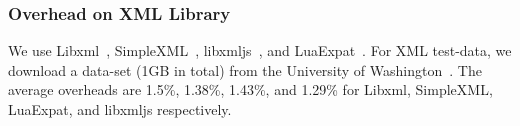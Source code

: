 %


\subsubsection{Overhead on XML Library}
\label{appendix:microbenchmarks_xml}
We use Libxml~\cite{libxml}, SimpleXML~\cite{simplexml}, libxmljs~\cite{libxmljs}, and LuaExpat~\cite{luaexpat}. 
%
For XML test-data, we download a data-set (1GB in total) from the University of Washington~\cite{xmldata}.
The average overheads are 1.5\%, 1.38\%, 1.43\%, and 1.29\% for Libxml, SimpleXML, LuaExpat, and libxmljs respectively.








